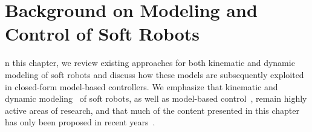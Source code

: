 \chapter{Background on Modeling and Control of Soft Robots}\label{chp:background}

n this chapter, we review existing approaches for both kinematic and dynamic modeling of soft robots and discuss how these models are subsequently exploited in closed-form model-based controllers.
We emphasize that kinematic and dynamic modeling~\citep{armanini2023soft} of soft robots, as well as model-based control~\citep{della2023model}, remain highly active areas of research, and that much of the content presented in this chapter has only been proposed in recent years~\citep{yasa2023overview}.



